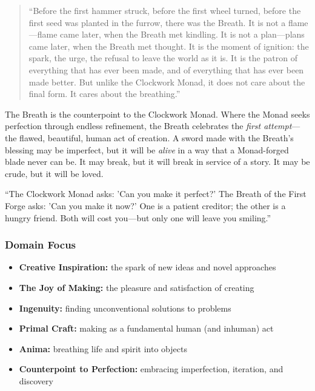 \begin{quote}
``Before the first hammer struck, before the first wheel turned, before the first seed was planted in the furrow, there was the Breath. It is not a flame---flame came later, when the Breath met kindling. It is not a plan---plans came later, when the Breath met thought. It is the moment of ignition: the spark, the urge, the refusal to leave the world as it is. It is the patron of everything that has ever been made, and of everything that has ever been made better. But unlike the Clockwork Monad, it does not care about the final form. It cares about the breathing.''
\end{quote}

The Breath is the counterpoint to the Clockwork Monad. Where the Monad seeks perfection through endless refinement, the Breath celebrates the \emph{first attempt}---the flawed, beautiful, human act of creation. A sword made with the Breath's blessing may be imperfect, but it will be \emph{alive} in a way that a Monad-forged blade never can be. It may break, but it will break in service of a story. It may be crude, but it will be loved.

\begin{tcolorbox}[colback=blue!5!white,colframe=blue!70!black,title=The Gray Wanderer's Note]
``The Clockwork Monad asks: 'Can you make it perfect?' The Breath of the First Forge asks: 'Can you make it now?' One is a patient creditor; the other is a hungry friend. Both will cost you---but only one will leave you smiling.''
\end{tcolorbox}

\subsubsection*{Domain Focus}
\begin{itemize}
  \item \textbf{Creative Inspiration:} the spark of new ideas and novel approaches
  \item \textbf{The Joy of Making:} the pleasure and satisfaction of creating
  \item \textbf{Ingenuity:} finding unconventional solutions to problems
  \item \textbf{Primal Craft:} making as a fundamental human (and inhuman) act
  \item \textbf{Anima:} breathing life and spirit into objects
  \item \textbf{Counterpoint to Perfection:} embracing imperfection, iteration, and discovery
\end{itemize}

